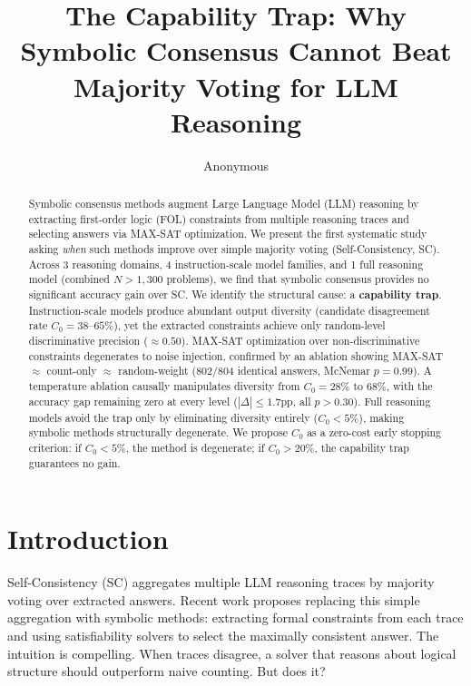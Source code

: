 \documentclass[11pt,a4paper]{article}
\title{The Capability Trap: Why Symbolic Consensus Cannot Beat Majority Voting for LLM Reasoning}
\author{Anonymous}
\date{}
\begin{document}
\maketitle

\begin{abstract}
Symbolic consensus methods augment Large Language Model (LLM) reasoning by extracting first-order logic (FOL) constraints from multiple reasoning traces and selecting answers via MAX-SAT optimization. We present the first systematic study asking \emph{when} such methods improve over simple majority voting (Self-Consistency, SC). Across 3 reasoning domains, 4 instruction-scale model families, and 1 full reasoning model (combined $N{>}1{,}300$ problems), we find that symbolic consensus provides no significant accuracy gain over SC. We identify the structural cause: a \textbf{capability trap}. Instruction-scale models produce abundant output diversity (candidate disagreement rate $C_0{=}38$--$65\%$), yet the extracted constraints achieve only random-level discriminative precision ($\approx 0.50$). MAX-SAT optimization over non-discriminative constraints degenerates to noise injection, confirmed by an ablation showing MAX-SAT $\approx$ count-only $\approx$ random-weight (802/804 identical answers, McNemar $p{=}0.99$). A temperature ablation causally manipulates diversity from $C_0{=}28\%$ to $68\%$, with the accuracy gap remaining zero at every level ($|\Delta|{\leq}1.7$pp, all $p{>}0.30$). Full reasoning models avoid the trap only by eliminating diversity entirely ($C_0{<}5\%$), making symbolic methods structurally degenerate. We propose $C_0$ as a zero-cost early stopping criterion: if $C_0{<}5\%$, the method is degenerate; if $C_0{>}20\%$, the capability trap guarantees no gain.
\end{abstract}

\section{Introduction}

Self-Consistency (SC) aggregates multiple LLM reasoning traces by majority voting over extracted answers. Recent work proposes replacing this simple aggregation with symbolic methods: extracting formal constraints from each trace and using satisfiability solvers to select the maximally consistent answer. The intuition is compelling. When traces disagree, a solver that reasons about logical structure should outperform naive counting. But does it?
\end{document}
